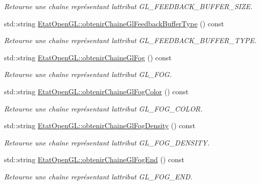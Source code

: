 \begin{DoxyCompactItemize}
\begin{DoxyCompactList}\small\item\em Retourne une chaîne représentant l\textquotesingle{}attribut G\+L\+\_\+\+F\+E\+E\+D\+B\+A\+C\+K\+\_\+\+B\+U\+F\+F\+E\+R\+\_\+\+S\+I\+Z\+E. \end{DoxyCompactList}\item 
std\+::string \hyperlink{group__utilitaire_ga30bdbc77ee2c0b27ee48e5de2654d29c}{Etat\+Open\+G\+L\+::obtenir\+Chaine\+Gl\+Feedback\+Buffer\+Type} () const 
\begin{DoxyCompactList}\small\item\em Retourne une chaîne représentant l\textquotesingle{}attribut G\+L\+\_\+\+F\+E\+E\+D\+B\+A\+C\+K\+\_\+\+B\+U\+F\+F\+E\+R\+\_\+\+T\+Y\+P\+E. \end{DoxyCompactList}\item 
std\+::string \hyperlink{group__utilitaire_ga73b3d82b8c3940a818e1dab3d69e4899}{Etat\+Open\+G\+L\+::obtenir\+Chaine\+Gl\+Fog} () const 
\begin{DoxyCompactList}\small\item\em Retourne une chaîne représentant l\textquotesingle{}attribut G\+L\+\_\+\+F\+O\+G. \end{DoxyCompactList}\item 
std\+::string \hyperlink{group__utilitaire_ga572f199118c8cb77085a7eb21f05f7fb}{Etat\+Open\+G\+L\+::obtenir\+Chaine\+Gl\+Fog\+Color} () const 
\begin{DoxyCompactList}\small\item\em Retourne une chaîne représentant l\textquotesingle{}attribut G\+L\+\_\+\+F\+O\+G\+\_\+\+C\+O\+L\+O\+R. \end{DoxyCompactList}\item 
std\+::string \hyperlink{group__utilitaire_ga9ad8c1de41bc053666ffe001bca8f064}{Etat\+Open\+G\+L\+::obtenir\+Chaine\+Gl\+Fog\+Density} () const 
\begin{DoxyCompactList}\small\item\em Retourne une chaîne représentant l\textquotesingle{}attribut G\+L\+\_\+\+F\+O\+G\+\_\+\+D\+E\+N\+S\+I\+T\+Y. \end{DoxyCompactList}\item 
std\+::string \hyperlink{group__utilitaire_ga9c6edbc286eed9a47b2e3ed2426e2b92}{Etat\+Open\+G\+L\+::obtenir\+Chaine\+Gl\+Fog\+End} () const 
\begin{DoxyCompactList}\small\item\em Retourne une chaîne représentant l\textquotesingle{}attribut G\+L\+\_\+\+F\+O\+G\+\_\+\+E\+N\+D. \end{DoxyCompactList}\item 

\end{DoxyCompactItemize}
